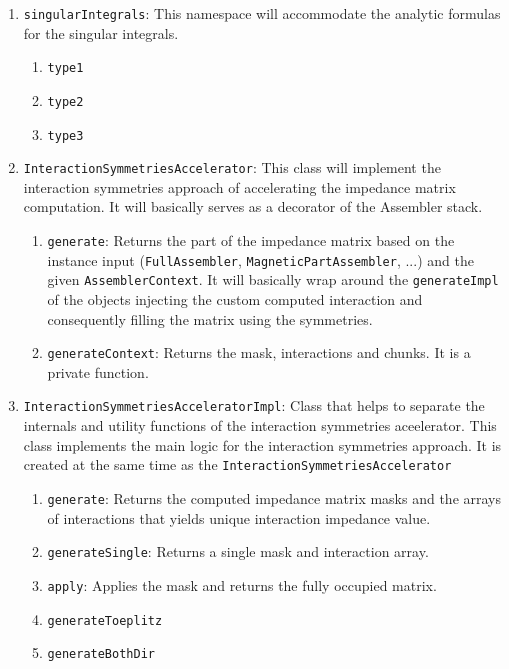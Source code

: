 \documentclass[9pt]{article}
\begin{document}
    \begin{enumerate}[label=\Roman*.]
        \item \texttt{singularIntegrals}: This namespace will accommodate the analytic formulas for the singular integrals.
        \begin{enumerate}[label=\roman*.]
            \item \texttt{type1}
            \item \texttt{type2}
            \item \texttt{type3}
        \end{enumerate}
        \item \texttt{InteractionSymmetriesAccelerator}: This class will implement the interaction symmetries approach of accelerating the impedance matrix computation. It will basically serves as a decorator of the Assembler stack.
        \begin{enumerate}[label=\roman*.]
            \item \texttt{generate}: Returns the part of the impedance matrix based on the instance input (\texttt{FullAssembler}, \texttt{MagneticPartAssembler}, ...) and the given \texttt{AssemblerContext}. It will basically wrap around the \texttt{generateImpl} of the objects injecting the custom computed interaction and consequently filling the matrix using the symmetries.
            \item \texttt{generateContext}: Returns the mask, interactions and chunks. It is a private function.
        \end{enumerate}
        \item \texttt{InteractionSymmetriesAcceleratorImpl}: Class that helps to separate the internals and utility functions of the interaction symmetries aceelerator. This class implements the main logic for the interaction symmetries approach. It is created at the same time as the \texttt{InteractionSymmetriesAccelerator}
        \begin{enumerate}[label=\roman*.]
            \item \texttt{generate}: Returns the computed impedance matrix masks and the arrays of interactions that yields unique interaction impedance value.
            \item \texttt{generateSingle}: Returns a single mask and interaction array.
            \item \texttt{apply}: Applies the mask and returns the fully occupied matrix.
            \item \texttt{generateToeplitz}
            \item \texttt{generateBothDir}

\end{enumerate}
\end{enumerate}
\end{document}
